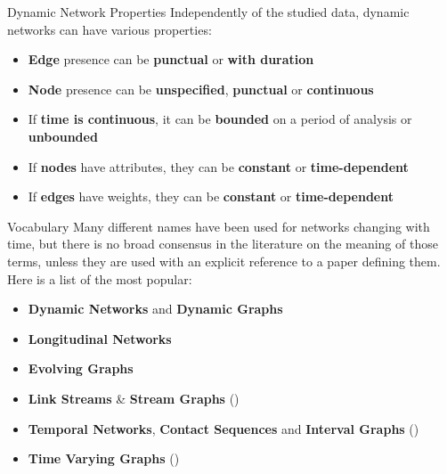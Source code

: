 \begin{textbox}{Dynamic Network Properties}
    Independently of the studied data, dynamic networks can have various properties:
    \begin{itemize}
        \item \textbf{Edge} presence can be \textbf{punctual} or \textbf{with duration}
        \item \textbf{Node} presence can be \textbf{unspecified}, \textbf{punctual} or \textbf{continuous}
        \item If \textbf{time is continuous}, it can be \textbf{bounded} on a period of analysis or \textbf{unbounded}
        \item If \textbf{nodes} have attributes, they can be \textbf{constant} or \textbf{time-dependent}
        \item If \textbf{edges} have weights, they can be \textbf{constant} or \textbf{time-dependent}
    \end{itemize}
\end{textbox}


\begin{textbox}{Vocabulary}
    Many different names have been used for networks changing with time, but there is no broad consensus in the literature on the meaning of those terms, unless they are used with an explicit reference to a paper defining them. Here is a list of the most popular:
    \begin{itemize}
        \item \textbf{Dynamic Networks} and \textbf{Dynamic Graphs}
        \item \textbf{Longitudinal Networks}
        \item \textbf{Evolving Graphs}
        \item \textbf{Link Streams} \& \textbf{Stream Graphs} (\cite{latapy2018stream})
        \item \textbf{Temporal Networks}, \textbf{Contact Sequences} and \textbf{Interval Graphs} (\cite{holme2012temporal})
        \item \textbf{Time Varying Graphs} (\cite{casteigts2012time})
    \end{itemize}
\end{textbox}



